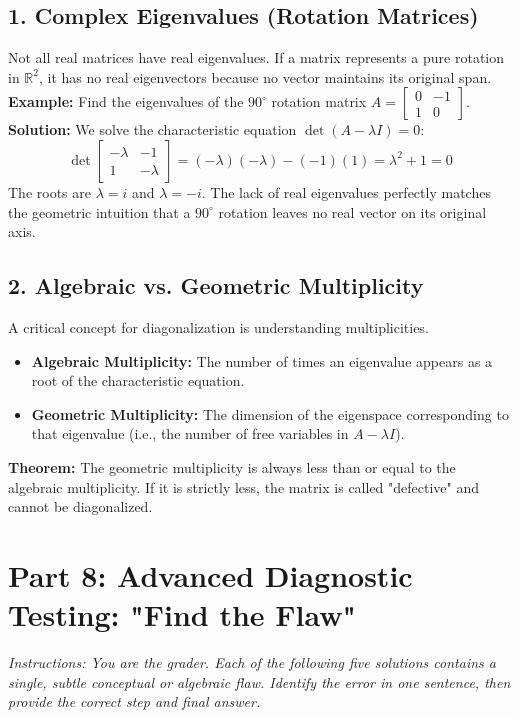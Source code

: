 \documentclass[11pt, a4paper]{article}
\theoremstyle{definition}
\theoremstyle{remark}
\newcommand{\R}{\mathbb{R}}
\begin{document}
\subsection{1. Complex Eigenvalues (Rotation Matrices)}
Not all real matrices have real eigenvalues. If a matrix represents a pure rotation in $\R^2$, it has no real eigenvectors because no vector maintains its original span.
\textbf{Example:} Find the eigenvalues of the $90^\circ$ rotation matrix $A = \begin{bmatrix} 0 & -1 \\ 1 & 0 \end{bmatrix}$.
\textbf{Solution:} We solve the characteristic equation $\det(A - \lambda I) = 0$:
\[ \det \begin{bmatrix} -\lambda & -1 \\ 1 & -\lambda \end{bmatrix} = (-\lambda)(-\lambda) - (-1)(1) = \lambda^2 + 1 = 0 \]
The roots are $\lambda = i$ and $\lambda = -i$. The lack of real eigenvalues perfectly matches the geometric intuition that a $90^\circ$ rotation leaves no real vector on its original axis.

\subsection{2. Algebraic vs. Geometric Multiplicity}
A critical concept for diagonalization is understanding multiplicities.
\begin{itemize}
    \item \textbf{Algebraic Multiplicity:} The number of times an eigenvalue appears as a root of the characteristic equation.
    \item \textbf{Geometric Multiplicity:} The dimension of the eigenspace corresponding to that eigenvalue (i.e., the number of free variables in $A - \lambda I$).
\end{itemize}
\textbf{Theorem:} The geometric multiplicity is always less than or equal to the algebraic multiplicity. If it is strictly less, the matrix is called "defective" and cannot be diagonalized.

\newpage
\section{Part 8: Advanced Diagnostic Testing: "Find the Flaw"}

\textit{Instructions: You are the grader. Each of the following five solutions contains a single, subtle conceptual or algebraic flaw. Identify the error in one sentence, then provide the correct step and final answer.}
\end{document}
